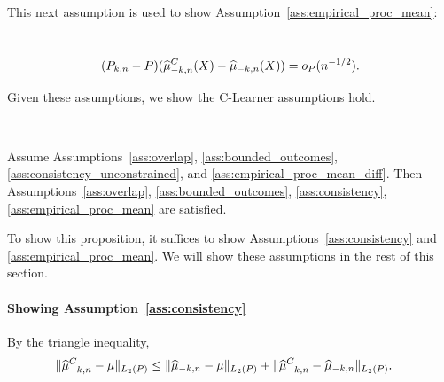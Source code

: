 This next assumption is used to show Assumption~\ref{ass:empirical_proc_mean}:
\begin{assumption}
\label{ass:empirical_proc_mean_diff}\
$$(P_{k,n}-P)(  \widehat{\mu}_{-k,n}^C(X)- \widehat{\mu}_{-k,n}(X)) =o_P(n^{-1/2}).$$
\end{assumption}
Given these assumptions, we show the C-Learner assumptions hold. 
\begin{proposition}\
\label{prop:translate}

Assume Assumptions~\ref{ass:overlap}, 
\ref{ass:bounded_outcomes},
\ref{ass:consistency_unconstrained},
and \ref{ass:empirical_proc_mean_diff}.
Then Assumptions~\ref{ass:overlap}, 
\ref{ass:bounded_outcomes},
\ref{ass:consistency}, \ref{ass:empirical_proc_mean}
are satisfied. 
\end{proposition}
To show this proposition, it suffices to show Assumptions~\ref{ass:consistency} and \ref{ass:empirical_proc_mean}. We will show these assumptions in the rest of this section.
\paragraph{Showing  Assumption~\ref{ass:consistency}}
By the triangle inequality, 
\begin{align}
    \|\widehat{\mu}^C_{-k,n}-\mu\|_{L_2(P)} &\leq \|\widehat{\mu}_{-k,n}-\mu\|_{L_2(P)} + \|\widehat{\mu}^C_{-k,n}-\widehat{\mu}_{-k,n} \|_{L_2(P)}
.\end{align}

